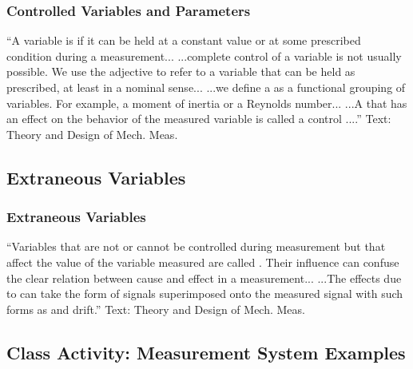 \documentclass[fleqn]{beamer} %
\newcommand{\sectionIIsubsectionIIItitle}{Controlled Variables and Parameters}
\newcommand{\sectionIIsubsectionIVtitle}{Extraneous Variables}
\newcommand{\sectionIIsubsectionVtitle}{Class Activity: Measurement System Examples}
\begin{document}
			\begin{frame}
				\frametitle{\sectionIIsubsectionIIItitle}

				{``A variable is {\BL \underline{\hspace{30mm}}} if it can be held at a constant value
				or at some prescribed condition during a measurement... ...complete control of a variable is not usually
				possible. We use the adjective {\BL \underline{\hspace{30mm}}} to refer to a variable that can be held as prescribed, at
				least in a nominal sense... \vspc
				...we define a {\GR \underline{\hspace{30mm}}} as a functional grouping of variables. For example, a moment of inertia or a Reynolds number... ...A {\GR \underline{\hspace{30mm}}} that has an effect on the behavior of the measured variable is called a control {\GR \underline{\hspace{30mm}}}....''} \vspc
				{\tiny Text: Theory and Design of Mech. Meas.}

			\end{frame}

		\subsection{\sectionIIsubsectionIVtitle}\label{sectionIIsubsectionIV}

			\begin{frame}
				\frametitle{\sectionIIsubsectionIVtitle}

				{``Variables that are not or cannot be controlled during measurement but that affect the value of the
				variable measured are called {\RD \underline{\hspace{30mm}}  \underline{\hspace{30mm}}}. Their influence can confuse the clear relation
				between cause and effect in a measurement... ...The effects due to {\RD \underline{\hspace{30mm}} \underline{\hspace{30mm}}} can take the form of signals superimposed
				onto the measured signal with such forms as {\PR \underline{\hspace{30mm}}} and drift.''} \vspc
				{\tiny Text: Theory and Design of Mech. Meas.}

			\end{frame}
		
		\subsection{\sectionIIsubsectionVtitle}\label{sectionIIsubsectionV}
\end{document}
